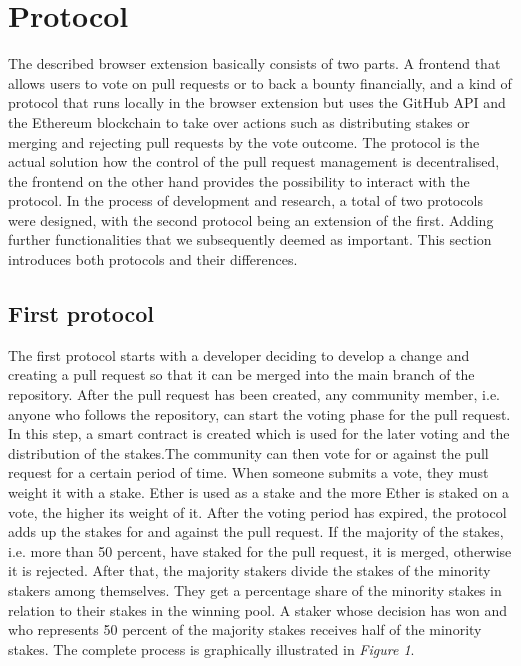 \documentclass[sigconf]{acmart}
\begin{document}
\section{Protocol}
The described browser extension basically consists of two parts. A frontend that allows users to vote on pull requests or to back 
a bounty financially, and a kind of protocol that runs locally in the browser extension but uses the GitHub API and the Ethereum 
blockchain to take over actions such as distributing stakes or merging and rejecting pull requests by the vote outcome.
The protocol is the actual solution how the control of the pull request management is decentralised, the frontend on the 
other hand provides the possibility to interact with the protocol. In the process of development and research, a total of two 
protocols were designed, with the second protocol being an extension of the first. Adding further functionalities that we 
subsequently deemed as important. This section introduces both protocols and their differences.

\subsection{First protocol}
The first protocol starts with a developer deciding to develop a change and creating a pull request so that it can be merged into the 
main branch of the repository. After the pull request has been created, any community member, i.e. anyone who follows the repository, 
can start the voting phase for the pull request. In this step, a smart contract is created which is used for the later voting and the distribution
 of the stakes.The community can then vote for or against the pull request for a certain period of time.
When someone submits a vote, they must weight it with a stake. Ether is used as a stake and the more Ether is staked on a vote, 
the higher its weight of it. After the voting period has expired, the protocol adds up the stakes for and against the pull request.
If the majority of the stakes, i.e. more than 50 percent, have staked for the pull request, it is merged, otherwise it is rejected.
After that, the majority stakers divide the stakes of the minority stakers among themselves. They get a percentage share of the minority 
stakes in relation to their stakes in the winning pool. A staker whose decision has won and who represents 50 percent of the majority 
stakes receives half of the minority stakes. The complete process is graphically illustrated in \textit{Figure 1}.
\end{document}
